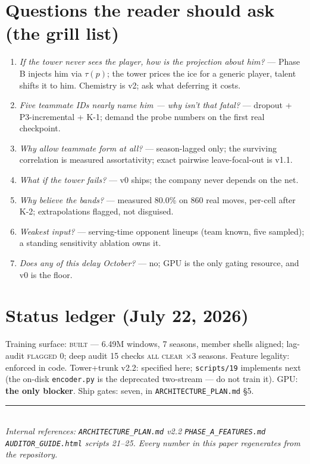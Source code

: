 \documentclass[11pt]{article}
\begin{document}
\section{Questions the reader should ask (the grill list)}
\begin{enumerate}[leftmargin=1.4em,itemsep=2pt]
\item \emph{If the tower never sees the player, how is the projection about
him?} --- Phase B injects him via $\tau(p)$; the tower prices the ice for a
generic player, talent shifts it to him. Chemistry is v2; ask what deferring
it costs.
\item \emph{Five teammate IDs nearly name him --- why isn't that fatal?} ---
dropout + P3-incremental + K-1; demand the probe numbers on the first real
checkpoint.
\item \emph{Why allow teammate form at all?} --- season-lagged only; the
surviving correlation is measured assortativity; exact pairwise leave-focal-out
is v1.1.
\item \emph{What if the tower fails?} --- v0 ships; the company never depends
on the net.
\item \emph{Why believe the bands?} --- measured 80.0\% on 860 real moves,
per-cell after K-2; extrapolations flagged, not disguised.
\item \emph{Weakest input?} --- serving-time opponent lineups (team known,
five sampled); a standing sensitivity ablation owns it.
\item \emph{Does any of this delay October?} --- no; GPU is the only gating
resource, and v0 is the floor.
\end{enumerate}

\section*{Status ledger (July 22, 2026)}
Training surface: \textsc{built} --- 6.49M windows, 7 seasons, member shells
aligned; lag-audit \textsc{flagged 0}; deep audit 15 checks \textsc{all clear}
$\times$3 seasons. Feature legality: enforced in code. Tower+trunk v2.2:
specified here; \texttt{scripts/19} implements next (the on-disk
\texttt{encoder.py} is the deprecated two-stream --- do not train it). GPU:
\textbf{the only blocker}. Ship gates: seven, in
\texttt{ARCHITECTURE\_PLAN.md} \S5.

\vspace{6pt}
\noindent\rule{\textwidth}{0.4pt}\\
\small\emph{Internal references: \texttt{ARCHITECTURE\_PLAN.md} v2.2 \textperiodcentered{}
\texttt{PHASE\_A\_FEATURES.md} \textperiodcentered{} \texttt{AUDITOR\_GUIDE.html}
\textperiodcentered{} scripts 21--25. Every number in this paper regenerates from the
repository.}
\end{document}
